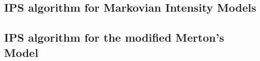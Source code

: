 \subsection{IPS algorithm for Markovian Intensity Models}
\subsection{IPS algorithm for the modified Merton's Model}

